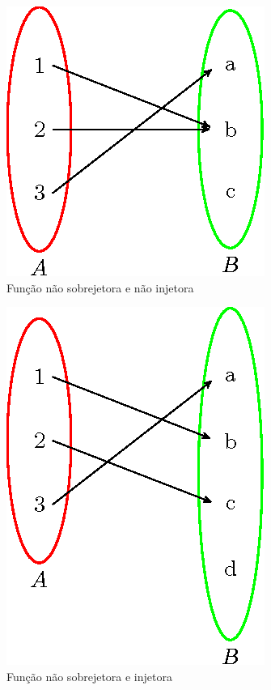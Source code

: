 \begin{multicols}{2}
\begin{figure}[H]
\centering
 \includegraphics{cap_funcao/figs/tikz/figura_cap_funcao_11}
\caption{Função não sobrejetora e não injetora}
\end{figure}

\begin{figure}[H]
\centering
 \includegraphics{cap_funcao/figs/tikz/figura_cap_funcao_7}
\caption{Função não sobrejetora e injetora}
\end{figure}
\end{multicols}

